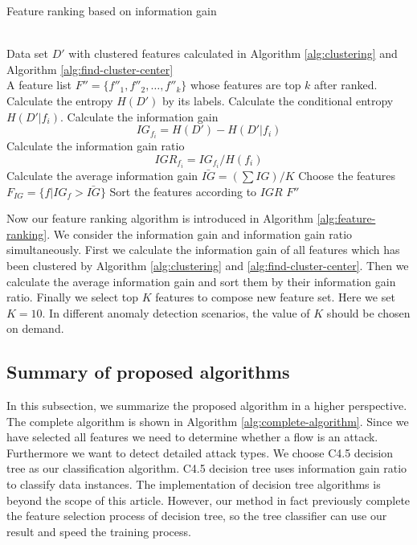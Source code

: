\documentclass{ieeeaccess}
\theoremstyle{definition}
\begin{document}
\begin{algorithm}
    \caption{Feature ranking based on information gain}
    \label{alg:feature-ranking}
    \begin{algorithmic}[1]
        \REQUIRE ~~\\
            Data set $D'$ with clustered features calculated in Algorithm \ref{alg:clustering} and Algorithm \ref{alg:find-cluster-center}
        \ENSURE ~~\\
            A feature list $F''=\{f''_1, f''_2, \ldots, f''_k\}$ whose  features are top $k$ after ranked. 
        \STATE Calculate the entropy $H(D')$ by its labels.
            \STATE Calculate the conditional entropy $H(D'|f_i)$.
            \STATE Calculate the information gain $$IG_{f_i} = H(D') - H(D'|f_i)$$
            \STATE Calculate the information gain ratio 
            $$IGR_{f_i} = IG_{f_i}/H(f_i)$$
        \ENDFOR
        \STATE Calculate the average information gain $\bar{IG}=(\sum IG)/K$
        \STATE Choose the features $F_{IG}=\{f|IG_{f} > \bar{IG}\}$
        \STATE Sort the features according to $IGR$
        \RETURN $F''$
        \end{algorithmic}
\end{algorithm}

Now our feature ranking algorithm is introduced in Algorithm \ref{alg:feature-ranking}. We consider the information gain and information gain ratio simultaneously. First we calculate the information gain of all features which has been clustered by Algorithm \ref{alg:clustering} and \ref{alg:find-cluster-center}. Then we calculate the average information gain and sort them by their information gain ratio. Finally we select top $K$ features to compose new feature set. Here we set $K=10$. In different anomaly detection scenarios, the value of $K$ should be chosen on demand.

\subsection{Summary of proposed algorithms}

In this subsection, we summarize the proposed algorithm in a higher perspective. The complete algorithm is shown in Algorithm \ref{alg:complete-algorithm}. 
Since we have selected all features we need to determine whether a flow is an attack. Furthermore we want to detect detailed attack types. We choose C4.5 decision tree\cite{quinlan2014c4} as our classification algorithm. C4.5 decision tree uses information gain ratio to classify data instances. The implementation of decision tree algorithms is beyond the scope of this article. However, our method in fact previously complete the feature selection process of decision tree, so the tree classifier can use our result and speed the training process.
\end{document}
